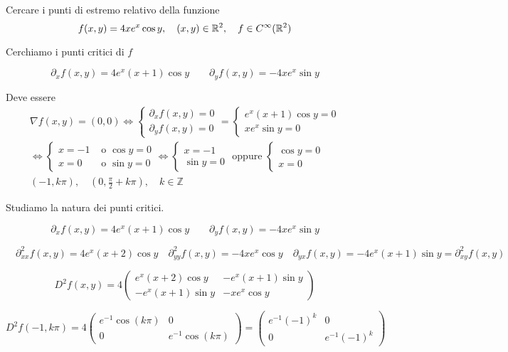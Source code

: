 \begin{exbar}
\begin{example}
	Cercare i punti di estremo relativo della funzione 
	$$f(x,y)=4xe^x\cos y, \quad (x,y)\in\mathbb{R}^2, \quad f \in C^\infty(\mathbb{R}^2)$$
	
	Cerchiamo i punti critici di $f$ 
	
	$$\partial_xf(x,y)=4e^x(x+1)\cos y \qquad \partial_yf(x,y)=-4xe^x\sin y$$
	
	Deve essere 
	\begin{gather*} 
		\nabla f(x,y)=(0,0) \Leftrightarrow 
		\begin{cases}
			\partial_x f(x,y)=0\\
			\partial_y f(x,y)=0
		\end{cases} = 
		\begin{cases}
			e^x(x+1)\cos y=0\\
			xe^x\sin y=0
		\end{cases}
		\\
		\Leftrightarrow 
		\begin{cases}
			x=-1 &\text{  o  }\cos y =0\\
			x=0 &\text{  o  }\sin y=0
		\end{cases} \Leftrightarrow 
		\begin{cases}
			x=-1\\
			\sin y =0
		\end{cases} \text{ oppure } 
		\begin{cases}
			\cos y=0\\
			x=0
		\end{cases}
		\\
		(-1,k\pi), \quad (0,\frac{\pi}{2}+k\pi), \quad k \in \mathbb{Z}
	\end{gather*}
	
	Studiamo la natura dei punti critici.
	
	$$\partial_xf(x,y)=4e^x(x+1)\cos y \qquad \partial_yf(x,y)=-4xe^x\sin y$$
	
	$$\quad \partial_{xx}^2f(x,y)=4e^x(x+2)\cos y \quad \partial_{yy}^2f(x,y)=-4xe^x \cos y \quad \partial_{yx}f(x,y)=-4e^x(x+1)\sin y= \partial_{xy}^2f(x,y)$$
	
	$$D^2f(x,y)=
	4 \begin{pmatrix}
		e^x(x+2)\cos y & -e^x(x+1)\sin y\\
		-e^x(x+1)\sin y & -x e^x \cos y
	\end{pmatrix}$$
	
	$$D^2f(-1, k\pi)=
	4 \begin{pmatrix}
		e^{-1}\cos(k \pi)&0\\
		0&e^{-1}\cos(k\pi)
	\end{pmatrix}=\begin{pmatrix}
		e^{-1}(-1)^k&0\\
		0&e^{-1}(-1)^k
	\end{pmatrix}$$
	

\end{example}
\end{exbar}
